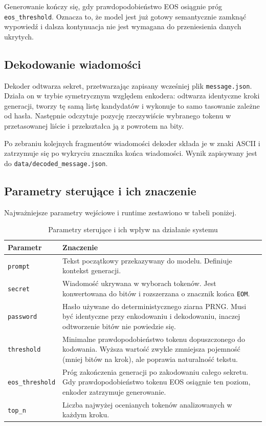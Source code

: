 \documentclass[12pt,a4paper]{article}
\begin{document}
Generowanie kończy się, gdy prawdopodobieństwo EOS osiągnie próg \texttt{eos\_threshold}. Oznacza to, że model jest już gotowy semantycznie zamknąć wypowiedź i dalsza kontynuacja nie jest wymagana do przeniesienia danych ukrytych.

\subsection{Dekodowanie wiadomości}
Dekoder odtwarza sekret, przetwarzając zapisany wcześniej plik \texttt{message.json}. Działa on w trybie symetrycznym względem enkodera: odtwarza identyczne kroki generacji, tworzy tę samą listę kandydatów i wykonuje to samo tasowanie zależne od hasła. Następnie odczytuje pozycję rzeczywiście wybranego tokenu w przetasowanej liście i przekształca ją z powrotem na bity.

Po zebraniu kolejnych fragmentów wiadomości dekoder składa je w znaki ASCII i zatrzymuje się po wykryciu znacznika końca wiadomości. Wynik zapisywany jest do \texttt{data/decoded\_message.json}.

\subsection{Parametry sterujące i ich znaczenie}
Najważniejsze parametry wejściowe i runtime zestawiono w tabeli poniżej.

\begin{table}[h]
\centering
\begin{tabular}{>{\raggedright\arraybackslash}p{3.2cm}p{9cm}}
\toprule
Parametr & Znaczenie \\
\midrule
\texttt{prompt} & Tekst początkowy przekazywany do modelu. Definiuje kontekst generacji. \\
\texttt{secret} & Wiadomość ukrywana w wyborach tokenów. Jest konwertowana do bitów i rozszerzana o znacznik końca \texttt{EOM}. \\
\texttt{password} & Hasło używane do deterministycznego ziarna PRNG. Musi być identyczne przy enkodowaniu i dekodowaniu, inaczej odtworzenie bitów nie powiedzie się. \\
\texttt{threshold} & Minimalne prawdopodobieństwo tokenu dopuszczonego do kodowania. Wyższa wartość zwykle zmniejsza pojemność (mniej bitów na krok), ale poprawia naturalność tekstu. \\
\texttt{eos\_threshold} & Próg zakończenia generacji po zakodowaniu całego sekretu. Gdy prawdopodobieństwo tokenu EOS osiągnie ten poziom, enkoder zatrzymuje generowanie. \\
\texttt{top\_n} & Liczba najwyżej ocenianych tokenów analizowanych w każdym kroku. \\
\bottomrule
\end{tabular}
\caption{Parametry sterujące i ich wpływ na działanie systemu}
\end{table}
\end{document}
